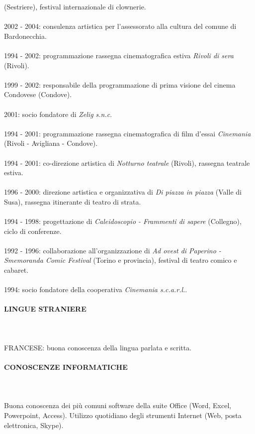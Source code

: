 \documentclass[a4paper, 12pt]{article}
\begin{document}
(Sestriere), festival internazionale di clownerie.
\\
\ \\
2002 - 2004: consulenza artistica per l'assessorato alla cultura del comune
di Bardonecchia.
\\
\ \\
1994 - 2002: programmazione rassegna cinematografica estiva \emph{Rivoli di
sera} (Rivoli).
\\
\ \\
1999 - 2002: responsabile della programmazione di prima visione del cinema
Condovese (Condove).
\\
\ \\
2001: socio fondatore di \emph{Zelig s.n.c}.
\\
\ \\
1994 - 2001: programmazione rassegna cinematografica di film d'essai
\emph{Cinemania} (Rivoli - Avigliana - Condove).
\\ 
\ \\
1994 - 2001: co-direzione artistica di \emph{Notturno teatrale} (Rivoli),
rassegna teatrale estiva.
\\
\ \\
1996 - 2000: direzione artistica e organizzativa di \emph{Di piazza in
piazza} (Valle di Susa), rassegna itinerante di teatro di strata.
\\
\ \\
1994 - 1998: progettazione di \emph{Caleidoscopio - Frammenti di sapere}
(Collegno), ciclo di conferenze.
\\
\ \\
1992 - 1996: collaborazione all'organizzazione di \emph{Ad ovest di
Paperino - Smemoranda Comic Festival} (Torino e provincia), festival di
teatro comico e cabaret.
\\
\ \\
1994: socio fondatore della cooperativa \emph{Cinemania s.c.a.r.l.}.
\\
\paragraph{LINGUE STRANIERE}
\ \\
\ \\
FRANCESE: buona conoscenza della lingua parlata e scritta.
\\
\paragraph{CONOSCENZE INFORMATICHE}
\ \\
\ \\
Buona conoscenza dei pi\`u comuni software della suite Office (Word, Excel,
Powerpoint, Access). Utilizzo quotidiano degli strumenti Internet (Web,
posta elettronica, Skype). 
\\
\end{document}
